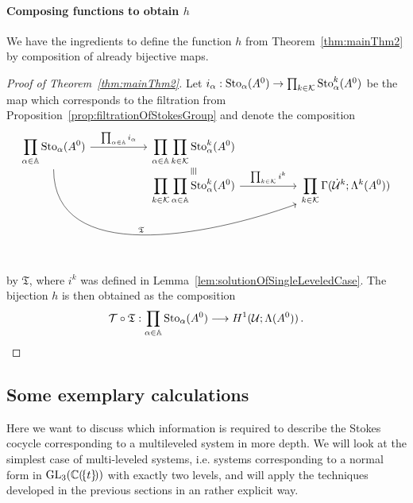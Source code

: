\paragraph{Composing functions to obtain $h$}
We have the ingredients to define the function $h$ from
Theorem~\ref{thm:mainThm2} by composition of already bijective maps.
\begin{proof}[Proof of Theorem~\ref{thm:mainThm2}]
  Let $i_\alpha:\operatorname{Sto}_\alpha(A^0)\to\prod_{k\in\mathcal{K}}\operatorname{Sto}_\alpha^k(A^0)$ be the
  map which corresponds to the filtration from
  Proposition~\ref{prop:filtrationOfStokesGroup} and
  denote the composition
  \[ \begin{tikzcd}[column sep=1.8cm,row sep=-0.2cm]
      \displaystyle \prod_{\alpha\in\A}\Sto_\alpha(A^0)
      \rar{\prod_{\alpha\in\A}i_\alpha}
      \arrow[ddrr, out=270,in=200,"\mathfrak{T}"]
      & \displaystyle \prod_{\alpha\in\A}\prod_{k\in\cK}\Sto_\alpha^k(A^0)
    \\ &\text{\rotatebox[origin=c]{-90}{$\equiv$}}
    \\ &\displaystyle \prod_{k\in\cK}\prod_{\alpha\in\A}\Sto_\alpha^k(A^0)
      \rar{\prod_{k\in\cK}i^k}
      & \displaystyle \prod_{k\in\cK}\Gamma(\dot\cU^k;\Lambda^k(A^0))
  \end{tikzcd} \]
  by $\mathfrak{T}$, where $i^k$ was defined in
  Lemma~\ref{lem:solutionOfSingleLeveledCase}.
  The bijection $h$ is then obtained as the composition
  \[
    \mathcal{T}\circ\mathfrak{T}: \prod_{\alpha\in\mathbb{A}}\operatorname{Sto}_\alpha(A^0)
    \longrightarrow H^1(\mathcal{U};\Lambda(A^0)) \,.
  \]
\end{proof}

\subsection{Some exemplary calculations}\label{sec:WhichInformationIsNeeded}
Here we want to discuss which information is required to describe the Stokes
cocycle corresponding to a multileveled system in more depth.
We will look at the simplest case of multi-leveled systems, i.e. systems
corresponding to a normal form in $\operatorname{GL}_3(\mathbb{C}(\!\{t\}\!))$ with exactly two
levels, and will apply the techniques developed in the previous sections in an
rather explicit way.

